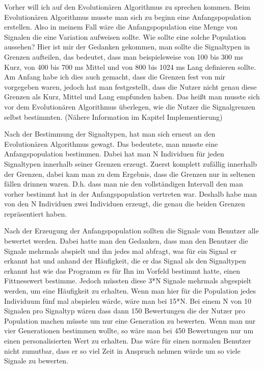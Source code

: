 Vorher will ich auf den Evolution{\"a}ren Algorithmus zu sprechen kommen. Beim Evolution{\"a}ren Algorithmus musste man sich zu beginn eine Anfangspopulation erstellen. Also in meinem Fall w{\"a}re die Anfangspopulation eine Menge von Signalen die eine Variation aufweisen sollte. Wie sollte eine solche Population aussehen? Hier ist mir der Gedanken gekommen, man sollte die Signaltypen in Grenzen aufteilen, das bedeutet, dass man beispielsweise von 100 bis 300 ms Kurz, von 400 bis 700 ms Mittel und von 800 bis 1024 ms Lang definieren sollte. Am Anfang habe ich dies auch gemacht, dass die Grenzen fest von mir vorgegeben waren, jedoch  hat man festgestellt, dass die Nutzer nicht genau diese Grenzen als Kurz, Mittel und Lang empfunden haben. Das hei{\ss}t man musste sich vor dem Evolution{\"a}ren Algorithmus {\"u}berlegen, wie die Nutzer die Signalgrenzen selbst bestimmten. (N{\"a}here Information im Kapitel Implementierung)

Nach der Bestimmung der Signaltypen, hat man sich erneut an den Evolution{\"a}ren Algorithmus gewagt. Das bedeutete, man musste eine Anfangspopulation bestimmen. Dabei hat man N Individuen f{\"u}r jeden Signaltypen innerhalb seiner Grenzen erzeugt. Zuerst komplett zuf{\"a}llig innerhalb der Grenzen, dabei kam man zu dem Ergebnis, dass die Grenzen nur in seltenen f{\"a}llen drinnen waren. D.h. dass man nie den vollst{\"a}ndigen Intervall den man vorher bestimmt hat in der Anfangspopulation vertreten war. Deshalb habe man von den N Individuen zwei Individuen erzeugt, die genau die beiden Grenzen repr{\"a}sentiert haben.

Nach der Erzeugung der Anfangspopulation sollten die Signale vom Benutzer alle bewertet werden. 
Dabei hatte man den Gedanken, dass man den Benutzer die Signale mehrmals abspielt und ihn jedes mal abfragt, was f{\"u}r ein Signal er erkannt hat und anhand der H{\"a}ufigkeit, die er das Signal als den Signaltypen erkannt hat wie das Programm es f{\"u}r Ihn im Vorfeld bestimmt hatte, einen Fittnesswert bestimme. Jedoch m{\"u}ssten diese 3*N Signale mehrmals abgespielt werden, um eine H{\"a}ufigkeit zu erhalten. Wenn man hier f{\"u}r die Population jedes Individuum f{\"u}nf mal abspielen w{\"a}rde, w{\"a}re man bei 15*N. Bei einem N von 10 Signalen pro Signaltyp w{\"a}ren dass dann 150 Bewertungen die der Nutzer pro Population machen m{\"u}sste um nur eine Generation zu bewerten. Wenn man nur vier Generationen bestimmen wollte, so wäre man bei 450 Bewertungen nur um einen personalisierten Wert zu erhalten. Das w{\"a}re f{\"u}r einen normalen Benutzer nicht zumutbar, dass er so viel Zeit in Anspruch nehmen w{\"u}rde um so viele Signale zu bewerten. 

